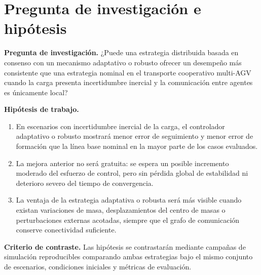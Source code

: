 \section{Pregunta de investigación e hipótesis}

\textbf{Pregunta de investigación.} ¿Puede una estrategia distribuida basada en consenso con un mecanismo adaptativo o robusto ofrecer un desempeño más consistente que una estrategia nominal en el transporte cooperativo multi-AGV cuando la carga presenta incertidumbre inercial y la comunicación entre agentes es únicamente local?

\textbf{Hipótesis de trabajo.}
\begin{enumerate}
  \item En escenarios con incertidumbre inercial de la carga, el controlador adaptativo o robusto mostrará menor error de seguimiento y menor error de formación que la línea base nominal en la mayor parte de los casos evaluados.
  \item La mejora anterior no será gratuita: se espera un posible incremento moderado del esfuerzo de control, pero sin pérdida global de estabilidad ni deterioro severo del tiempo de convergencia.
  \item La ventaja de la estrategia adaptativa o robusta será más visible cuando existan variaciones de masa, desplazamientos del centro de masas o perturbaciones externas acotadas, siempre que el grafo de comunicación conserve conectividad suficiente.
\end{enumerate}

\textbf{Criterio de contraste.} Las hipótesis se contrastarán mediante campañas de simulación reproducibles comparando ambas estrategias bajo el mismo conjunto de escenarios, condiciones iniciales y métricas de evaluación.
